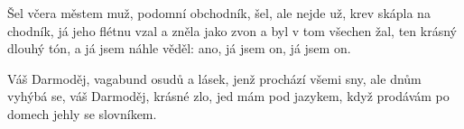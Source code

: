 \beginverse{}
Šel včera městem muž, podomní obchodník, 
šel, ale nejde už, krev skápla na chodník,
já jeho flétnu vzal a zněla jako zvon 
a byl v tom všechen žal, ten krásný dlouhý tón,
a já jsem náhle věděl: ano, já jsem on, já jsem on.
\endverse{}

\beginchorus{}
Váš Darmoděj, vagabund osudů a lásek,
jenž prochází všemi sny, ale dnům vyhýbá se,
váš Darmoděj, krásné zlo, jed mám pod jazykem,
když prodávám po domech jehly se slovníkem.
\endchorus{}

\endsong{}
